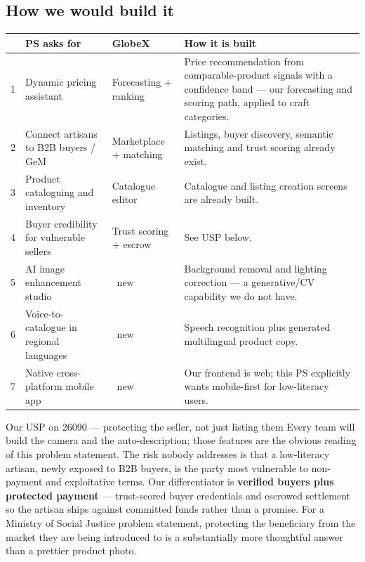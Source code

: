 \documentclass[11pt]{article}
\newcommand{\bld}{{\color{gxamber}\ding{53}}}       %
\begin{document}
\subsection*{How we would build it}
\renewcommand{\arraystretch}{1.35}
\noindent\begin{longtable}{@{}p{0.5cm}p{4.5cm}p{2.0cm}p{8.6cm}@{}}
\toprule
& \textbf{PS asks for} & \textbf{GlobeX} & \textbf{How it is built} \\
\midrule
\endhead
1 & Dynamic pricing assistant & Forecasting + ranking & Price recommendation from comparable-product signals with a confidence band --- our forecasting and scoring path, applied to craft categories. \\
2 & Connect artisans to B2B buyers / GeM & Marketplace + matching & Listings, buyer discovery, semantic matching and trust scoring already exist. \\
3 & Product cataloguing and inventory & Catalogue editor & Catalogue and listing creation screens are already built. \\
4 & Buyer credibility for vulnerable sellers & Trust scoring + escrow & See USP below. \\
5 & AI image enhancement studio & \bld\ new & Background removal and lighting correction --- a generative/CV capability we do not have. \\
6 & Voice-to-catalogue in regional languages & \bld\ new & Speech recognition plus generated multilingual product copy. \\
7 & Native cross-platform mobile app & \bld\ new & Our frontend is web; this PS explicitly wants mobile-first for low-literacy users. \\
\bottomrule
\end{longtable}

\begin{uspbox}{Our USP on 26090 --- protecting the seller, not just listing them}
Every team will build the camera and the auto-description; those features are the obvious reading of this
problem statement. The risk nobody addresses is that a low-literacy artisan, newly exposed to B2B buyers,
is the party most vulnerable to non-payment and exploitative terms. Our differentiator is
\textbf{verified buyers plus protected payment} --- trust-scored buyer credentials and escrowed settlement
so the artisan ships against committed funds rather than a promise. For a Ministry of Social Justice
problem statement, protecting the beneficiary from the market they are being introduced to is a
substantially more thoughtful answer than a prettier product photo.
\end{uspbox}
\end{document}
